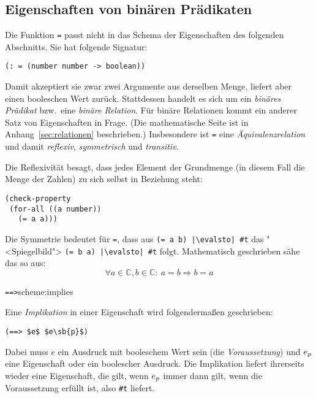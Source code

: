 \subsection{Eigenschaften von binären Prädikaten}

Die Funktion \lstinline{=} passt nicht in das Schema der Eigenschaften
des folgenden Abschnitts.  Sie hat folgende Signatur:
%
\begin{lstlisting}
(: = (number number -> boolean))
\end{lstlisting}
%
Damit akzeptiert sie zwar zwei Argumente aus derselben Menge, liefert
aber einen booleschen Wert zurück.  Stattdessen handelt es sich um ein
\textit{binäres Prädikat} bzw.\ eine \textit{binäre
  Relation}.  Für binäre
Relationen kommt ein anderer Satz von Eigenschaften in Frage.  (Die
mathematische Seite ist in Anhang~\ref{sec:relationen} beschrieben.)
Insbesondere ist \lstinline{=} eine
\textit{Äquivalenzrelation} und damit
\textit{reflexiv},
\textit{symmetrisch} und
\textit{transitiv}.

Die Reflexivität besagt, dass jedes Element der Grundmenge (in diesem
Fall die Menge der Zahlen) zu sich selbst in Beziehung steht:
%
\begin{lstlisting}
(check-property
 (for-all ((a number))
   (= a a)))
\end{lstlisting}
%
Die Symmetrie bedeutet für \lstinline{=}, dass aus
\lstinline{(= a b) |\evalsto| #t} das "<Spiegelbild">
\lstinline{(= b a) |\evalsto| #t}
folgt.  Mathematisch geschrieben sähe das so aus:
%
\begin{displaymath}
  \forall a \in \mathbb{C}, b\in\mathbb{C}:\ a = b \Rightarrow b = a
\end{displaymath}
%
\begin{feature}{\lstinline{==>}}{scheme:implies}

Eine \textit{Implikation} in einer Eigenschaft wird
folgendermaßen geschrieben:
\begin{lstlisting}
(==> $e$ $e\sb{p}$)
\end{lstlisting}
%
Dabei muss $e$ ein Ausdruck mit booleschem Wert sein (die
\textit{Voraussetzung}) und $e\sb{p}$ eine Eigenschaft oder ein
boolescher Ausdruck.  Die Implikation liefert ihrerseits wieder eine
Eigenschaft, die gilt, wenn $e\sb{p}$ immer dann gilt, wenn die
Voraussetzung erfüllt ist, also \lstinline{#t} liefert.
\end{feature}


